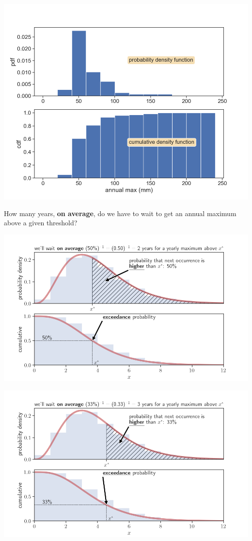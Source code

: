 \documentclass[
  letterpaper,
  DIV=11,
  numbers=noendperiod]{scrreprt}
\begin{document}
\includegraphics{archive/figures/pdf_cdf_bilbao.png}

How many years, \textbf{on average}, do we have to wait to get an annual
maximum above a given threshold?

\includegraphics{archive/figures/return_prob_050.png}

\includegraphics{archive/figures/return_prob_033.png}
\end{document}

